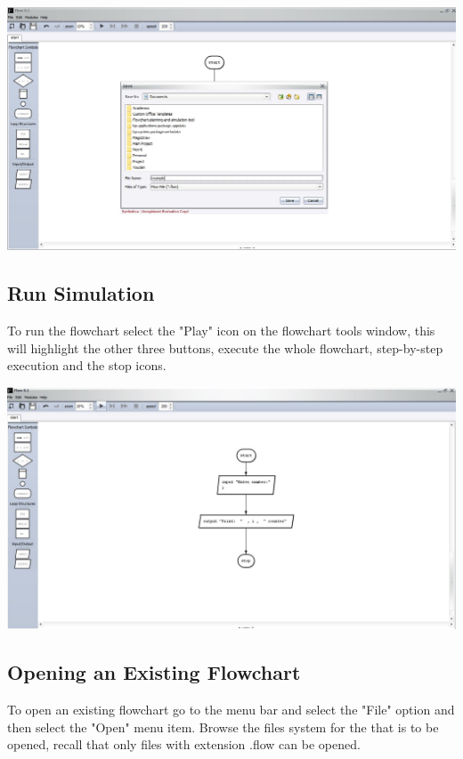 \documentclass[11pt,a4paper,titlepage]{article}
\begin{document}
	\includegraphics[width=14cm]{images/saveFile.jpg}
	
	\subsection{Run Simulation}
	To run the flowchart select the "Play" icon on the flowchart tools window, this will highlight the other three buttons, execute the whole flowchart, step-by-step execution and the stop icons.\newline \newline
	
	\includegraphics[width=14cm]{images/runSimulator.jpg}
	
		
	\subsection{Opening an Existing Flowchart}
	
	To open an existing flowchart go to the menu bar and select the "File" option and then select the "Open" menu item. Browse the files system for the that is to be opened, recall that only files with extension .flow can be opened. \newline
	
\end{document}
